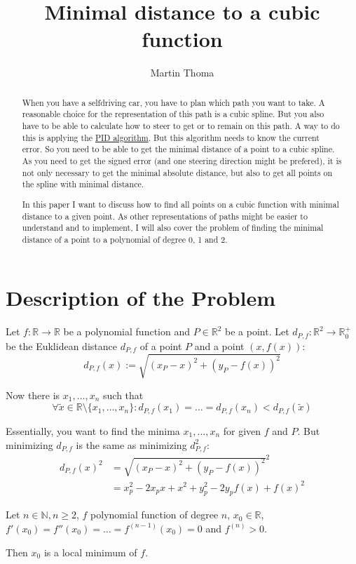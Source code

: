 \documentclass[a4paper]{scrartcl}
\title{Minimal distance to a cubic function}
\author{Martin Thoma}
\theoremstyle{break}
\theoremstyle{nonumberplain}
\def\mdr{\ensuremath{\mathbb{R}}}
\begin{document}
\maketitle
\begin{abstract}
When you have a selfdriving car, you have to plan which path you
want to take. A reasonable choice for the representation of this
path is a cubic spline. But you also have to be able to calculate
how to steer to get or to remain on this path. A way to do this
is applying the \href{https://en.wikipedia.org/wiki/PID_algorithm}{PID algorithm}.
But this algorithm needs to know the current error. So you need to 
be able to get the minimal distance of a point to a cubic spline.
As you need to get the signed error (and one steering direction might
be prefered), it is not only necessary to
get the minimal absolute distance, but also to get all points
on the spline with minimal distance.

In this paper I want to discuss how to find all points on a cubic 
function with minimal distance to a given point.
As other representations of paths might be easier to understand and
to implement, I will also cover the problem of finding the minimal
distance of a point to a polynomial of degree 0, 1 and 2.
\end{abstract}

\section{Description of the Problem}
Let $f: \mdr \rightarrow \mdr$ be a polynomial function and $P \in \mdr^2$
be a point. Let $d_{P,f}: \mdr^2 \rightarrow \mdr_0^+$
be the Euklidean distance $d_{P,f}$ of a point $P$ and a point $\left (x, f(x) \right )$:
\[d_{P,f} (x) := \sqrt{(x_P - x)^2 + (y_P - f(x))^2}\]

Now there is  $x_1, \dots, x_n$ such that 
\[\forall \tilde x \in \mathbb{R} \setminus \{x_1, \dots, x_n\}: d_{P,f}(x_1) = \dots = d_{P,f}(x_n) < d_{P,f}(\tilde x)\]

Essentially, you want to find the minima $x_1, \dots, x_n$ for given 
$f$ and $P$.
But minimizing $d_{P,f}$ is the same as minimizing $d_{P,f}^2$:
\begin{align}
    d_{P,f}(x)^2    &= \sqrt{(x_P - x)^2 + (y_P - f(x))^2}^2\\
                &= x_p^2 - 2x_p x + x^2 + y_p^2 - 2y_p f(x) + f(x)^2
\end{align}

\begin{theorem}\label{thm:minima-of-polynomials}
    Let $n \in \mathbb{N}, n \geq 2$, $f$ polynomial function of 
    degree $n$, $x_0 \in \mathbb{R}$,  \\
    $f'(x_0) = f''(x_0) = \dots = f^{(n-1)} (x_0) = 0$
    and $f^{(n)} > 0$.

    Then $x_0$ is a local minimum of $f$.
\end{theorem}
\clearpage
\end{document}
